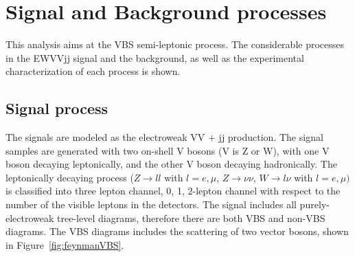 \chapter{Signal and Background processes}
\label{chap:sigbkg}

This analysis aims at the VBS semi-leptonic process. The considerable processes in the EWVVjj signal and the background, as well as the experimental characterization of each process is shown.

\section{Signal process}
The signals are modeled as the electroweak VV $\plus$ jj production. The signal samples are generated with two on-shell V bosons (V is Z or W), with one V boson decaying leptonically, and the other V boson decaying hadronically. The leptonically decaying process ($Z \rightarrow ll$ with $l = e,\mu$, $Z \rightarrow \nu\nu$, $W\rightarrow l\nu$ with $l = e,\mu)$ is classified into three lepton channel, 0, 1, 2-lepton channel with respect to the number of the visible leptons in the detectors. The signal includes all purely-electroweak tree-level diagrams, therefore there are both VBS and non-VBS diagrams.
The VBS diagrams includes the scattering of two vector bosons, shown in Figure~\ref{fig:feynmanVBS}.


